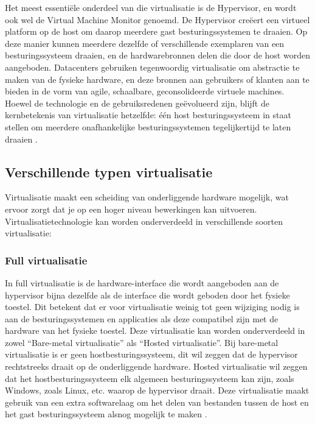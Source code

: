 Het meest essentiële onderdeel van die virtualisatie is de Hypervisor, en wordt ook wel de Virtual Machine Monitor genoemd. De Hypervisor creëert een virtueel platform op de host om daarop meerdere gast besturingssystemen te draaien. Op deze manier kunnen meerdere dezelfde of verschillende exemplaren van een besturingssysteem draaien, en de hardwarebronnen delen die door de host worden aangeboden. Datacenters gebruiken tegenwoordig virtualisatie om abstractie te maken van de fysieke hardware, en deze bronnen aan gebruikers of klanten aan te bieden in de vorm van agile, schaalbare, geconsolideerde virtuele machines. Hoewel de technologie en de gebruiksredenen geëvolueerd zijn, blijft de kernbetekenis van virtualisatie hetzelfde: één host besturingssysteem in staat stellen om meerdere onafhankelijke besturingssystemen tegelijkertijd te laten draaien \autocite{Oracle2012}.
\clearpage
\subsection{Verschillende typen virtualisatie}

Virtualisatie maakt een scheiding van onderliggende hardware mogelijk, wat ervoor zorgt dat je op een hoger niveau bewerkingen kan uitvoeren. Virtualisatietechnologie kan worden onderverdeeld in verschillende soorten virtualisatie: 

\subsubsection{Full virtualisatie}

In full virtualisatie is de hardware-interface die wordt aangeboden aan de hypervisor bijna dezelfde als de interface die wordt geboden door het fysieke toestel. Dit betekent dat er voor virtualisatie weinig tot geen wijziging nodig is aan de besturingssystemen en applicaties als deze compatibel zijn met de hardware van het fysieke toestel. Deze virtualisatie kan worden onderverdeeld in zowel “Bare-metal virtualisatie” als “Hosted virtualisatie”. Bij bare-metal virtualisatie is er geen hostbesturingssysteem, dit wil zeggen dat de hypervisor rechtstreeks draait op de onderliggende hardware. Hosted virtualisatie wil zeggen dat het hostbesturingssysteem elk algemeen besturingssysteem kan zijn, zoals Windows, zoals Linux, etc. waarop de hypervisor draait. Deze virtualisatie maakt gebruik van een extra softwarelaag om het delen van bestanden tussen de host en het gast besturingssysteem alsnog mogelijk te maken \autocite{Kedia2013}.

